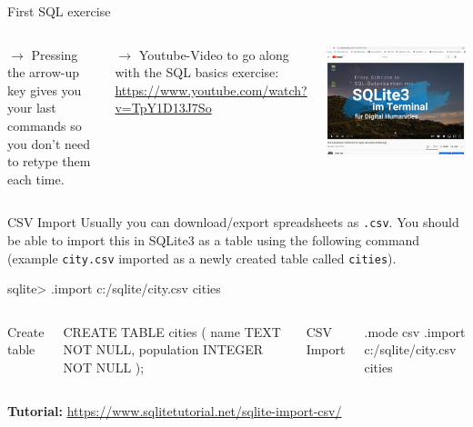 \begin{frame}{First SQL exercise}

\begin{columns}
$\to$ Pressing the arrow-up key gives you your last commands so you don't need to retype them each time.

$\to$ Youtube-Video to go along with the SQL basics exercise: \protect\url{https://www.youtube.com/watch?v=TpY1D13J7So} 

\includegraphics[width=\textwidth]{img/sql-basics-video-youtube.png}

\end{columns}

\end{frame}

\begin{frame}[fragile]{CSV Import}
\small {}
    Usually you can download/export spreadsheets as \texttt{.csv}.
    You should be able to import this in SQLite3 as a table using the following command (example \texttt{city.csv} imported as a newly created table called \texttt{cities}).
\begin{sqlcode}
sqlite> .import c:/sqlite/city.csv cities
\end{sqlcode}

\begin{columns}
Create table
\begin{sqlcode}
CREATE TABLE cities (
  name TEXT NOT NULL,
  population INTEGER NOT NULL 
);
\end{sqlcode}

CSV Import
\begin{sqlcode}
.mode csv
.import c:/sqlite/city.csv cities
\end{sqlcode}
\end{columns}

\textbf{Tutorial:} \protect\url{https://www.sqlitetutorial.net/sqlite-import-csv/}


\end{frame}

